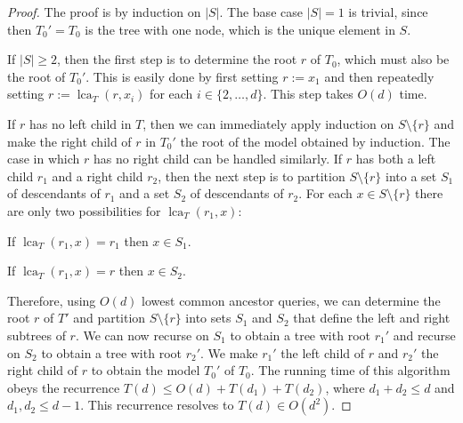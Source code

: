 \documentclass{patmorin}
\DeclareMathOperator{\lca}{lca}
\begin{document}
\begin{proof}
  The proof is by induction on $|S|$.  The base case $|S|=1$ is trivial, since then $T_0'=T_0$ is the tree with one node, which is the unique element in $S$.

  If $|S|\ge 2$, then the first step is to determine the root $r$ of $T_0$, which must also be the root of $T_0'$.  This is easily done by first setting $r:=x_1$ and then repeatedly setting $r:=\lca_{T}(r,x_i)$ for each $i\in\{2,\ldots,d\}$. This step takes $O(d)$ time.

  If $r$ has no left child in $T$, then we can immediately apply induction on $S\setminus\{r\}$ and make the right child of $r$ in $T_0'$ the root of the model obtained by induction.  The case in which $r$ has no right child can be handled similarly. If $r$ has both a left child $r_1$ and a right child $r_2$, then the next step is to partition $S\setminus\{r\}$ into a set $S_1$ of descendants of $r_1$ and a set $S_2$ of descendants of $r_2$.   For each $x\in S\setminus\{r\}$ there are only two possibilities for $\lca_{T}(r_1,x):$
  \begin{compactenum}
    \item If $\lca_{T}(r_1,x)=r_1$ then $x\in S_1$.
    \item If $\lca_{T}(r_1,x)=r$ then $x\in S_2$.
  \end{compactenum}
  Therefore, using $O(d)$ lowest common ancestor queries, we can determine the root $r$ of $T'$ and partition $S\setminus\{r\}$ into sets $S_1$ and $S_2$ that define the left and right subtrees of $r$.  We can now recurse on $S_1$ to obtain a tree with root $r_1'$ and recurse on $S_2$ to obtain a tree with root $r_2'$.  We make $r_1'$ the left child of $r$ and $r_2'$ the right child of $r$ to obtain the model $T_0'$ of $T_0$.  The running time of this  algorithm obeys the recurrence $T(d)\le O(d)+T(d_1) + T(d_2)$, where $d_1 + d_2 \leq d$ and $d_1, d_2 \leq d-1$.  This recurrence resolves to $T(d)\in O(d^2)$.
\end{proof}

\end{document}
